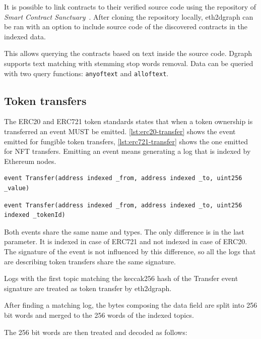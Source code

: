 It is possible to link contracts to their verified source code using the repository of \textit{Smart Contract Sanctuary}~\cite{smart_contract_sanctuary}. After cloning the repository locally, eth2dgraph can be ran with an option to include source code of the discovered contracts in the indexed data.

This allows querying the contracts based on text inside the source code. Dgraph supports text matching with stemming stop words removal. Data can be queried with two query functions: \texttt{anyoftext} and \texttt{alloftext}.

\subsection{Token transfers}

The ERC20 and ERC721 token standards states that when a token ownership is transferred an event MUST be emitted. \cref{lst:erc20-transfer} shows the event emitted for fungible token transfers, \cref{lst:erc721-transfer} shows the one emitted for NFT transfers. Emitting an event means generating a log that is indexed by Ethereum nodes.

\begin{lstlisting}[caption={Event emitted for ERC20 token transfer},label={lst:erc20-transfer},captionpos=b]
event Transfer(address indexed _from, address indexed _to, uint256 _value)
\end{lstlisting}

\begin{lstlisting}[caption={Event emitted for ERC721 token transfer},label={lst:erc721-transfer},captionpos=b]
event Transfer(address indexed _from, address indexed _to, uint256 indexed _tokenId)
\end{lstlisting}

Both events share the same name and types. The only difference is in the last parameter. It is indexed in case of ERC721 and not indexed in case of ERC20. The signature of the event is not influenced by this difference, so all the logs that are describing token transfers share the same signature.

Logs with the first topic matching the keccak256 hash of the Transfer event signature are treated as token transfer by eth2dgraph.

After finding a matching log, the bytes composing the data field are split into 256 bit words and merged to the 256 words of the indexed topics.

The 256 bit words are then treated and decoded as follows:

